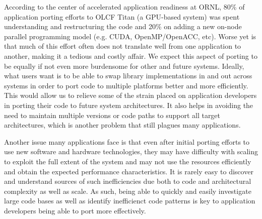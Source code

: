 According to the center of accelerated application readiness at \acs{ORNL}, 80\% of application porting efforts to OLCF Titan (a \acs{GPU}-based system) was spent understanding and restructuring the code and 20\% on adding a new on-node parallel programming model (e.g. CUDA, OpenMP/OpenACC, etc).
Worse yet is that much of this effort often does not translate well from one application to another, making it a tedious and costly affair.
We expect this aspect of porting to be equally if not even more burdensome for other and future systems.
Ideally, what users want is to be able to swap library implementations in and out across systems in order to port code to multiple platforms better and more efficiently.
This would allow us to relieve some of the strain placed on application developers in porting their code to future system architectures.
It also helps in avoiding the need to maintain multiple versions or code paths to support all target architectures, which is another problem that still plagues many applications.

Another issue many applications face is that even after initial porting efforts to use new software and hardware technologies, they may have difficulty with scaling to exploit the full extent of the system and may not use the resources efficiently and obtain the expected performance characteristics.
It is rarely easy to discover and understand sources of such inefficiencies due both to code and architectural complexity as well as scale.
As such, being able to quickly and easily investigate large code bases as well as identify inefficienct code patterns is key to application developers being able to port more effectively.





